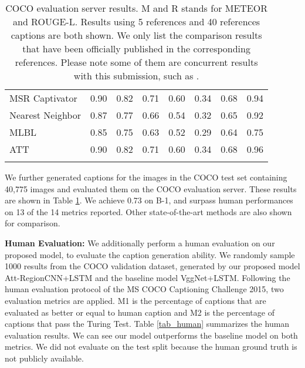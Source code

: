 \documentclass[10pt,journal,compsoc]{IEEEtran}
\begin{document}
\begin{table}[t!]
\begin{center}
{\begin{tabular}{ l c c c c c c c }
    MSR Captivator\cite{devlin2015language}&0.90&0.82&0.71&0.60&0.34&0.68&0.94\\
    Nearest Neighbor \cite{devlin2015exploring}&0.87&0.77&0.66&0.54&0.32&0.65&0.92\\
    MLBL \cite{kiros2014multimodal}&0.85&0.75&0.63&0.52&0.29&0.64&0.75\\
    ATT \cite{you2016image}&0.90&0.82&0.71&0.60&0.34&0.68&0.96\\
    \Xhline{2\arrayrulewidth}
  \end{tabular}}
  \vspace{-4pt}
  \caption{COCO evaluation server results. M and R stands for METEOR and ROUGE-L.
  Results using 5 references and 40 references captions are both shown. We only list the comparison results that have been officially published in the corresponding references. Please note some of them are concurrent results with this submission, such as \cite{you2016image}.}
  \label{tab3}
  \vspace{-23pt}
\end{center}
\end{table}

We further generated captions for the images in the COCO test set containing 40,775 images and evaluated them on the COCO evaluation server. These results are shown in Table \ref{tab3}. We achieve 0.73 on B-1, and surpass human performances on 13 of the 14 metrics reported. Other state-of-the-art methods are also shown for comparison.

\noindent\textbf{Human Evaluation:} We additionally perform a human evaluation on our proposed model, to evaluate the caption generation ability. We randomly sample 1000 results from the COCO validation dataset, generated by our proposed model Att-RegionCNN+LSTM and the baseline model VggNet+LSTM. Following the human evaluation protocol of the MS COCO Captioning Challenge 2015, two evaluation metrics are applied. M1 is the percentage of captions that are evaluated as better or equal to human caption and M2 is the percentage of captions that pass the Turing Test. Table \ref{tab_human} summarizes the human evaluation results. We can see our model outperforms the baseline model on both metrics. We did not evaluate on the test split because the human ground truth is not publicly available.
\end{document}
